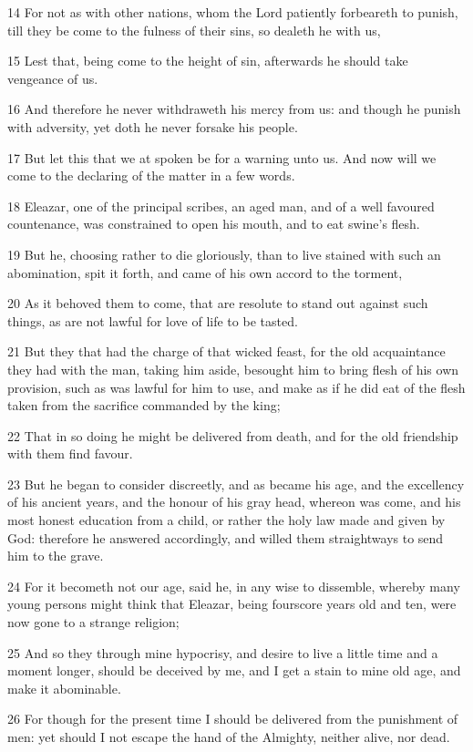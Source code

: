 \par 14 For not as with other nations, whom the Lord patiently forbeareth to punish, till they be come to the fulness of their sins, so dealeth he with us,
\par 15 Lest that, being come to the height of sin, afterwards he should take vengeance of us.
\par 16 And therefore he never withdraweth his mercy from us: and though he punish with adversity, yet doth he never forsake his people.
\par 17 But let this that we at spoken be for a warning unto us. And now will we come to the declaring of the matter in a few words.
\par 18 Eleazar, one of the principal scribes, an aged man, and of a well favoured countenance, was constrained to open his mouth, and to eat swine's flesh.
\par 19 But he, choosing rather to die gloriously, than to live stained with such an abomination, spit it forth, and came of his own accord to the torment,
\par 20 As it behoved them to come, that are resolute to stand out against such things, as are not lawful for love of life to be tasted.
\par 21 But they that had the charge of that wicked feast, for the old acquaintance they had with the man, taking him aside, besought him to bring flesh of his own provision, such as was lawful for him to use, and make as if he did eat of the flesh taken from the sacrifice commanded by the king;
\par 22 That in so doing he might be delivered from death, and for the old friendship with them find favour.
\par 23 But he began to consider discreetly, and as became his age, and the excellency of his ancient years, and the honour of his gray head, whereon was come, and his most honest education from a child, or rather the holy law made and given by God: therefore he answered accordingly, and willed them straightways to send him to the grave.
\par 24 For it becometh not our age, said he, in any wise to dissemble, whereby many young persons might think that Eleazar, being fourscore years old and ten, were now gone to a strange religion;
\par 25 And so they through mine hypocrisy, and desire to live a little time and a moment longer, should be deceived by me, and I get a stain to mine old age, and make it abominable.
\par 26 For though for the present time I should be delivered from the punishment of men: yet should I not escape the hand of the Almighty, neither alive, nor dead.
